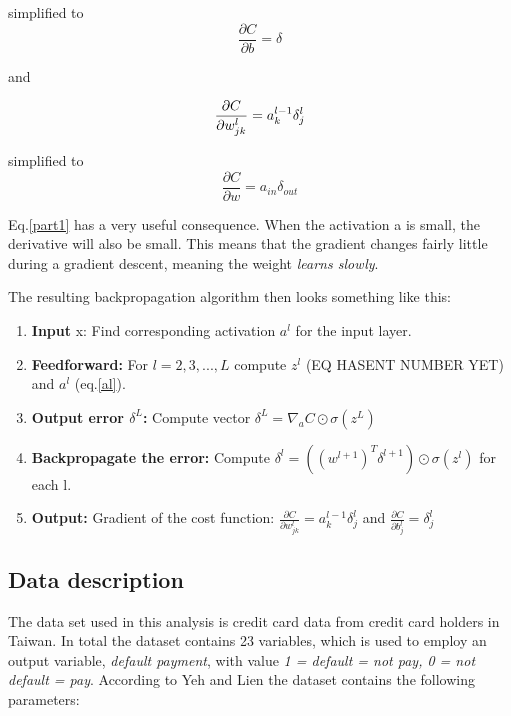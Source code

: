 \documentclass[a4paper,11pt,twocolumn]{article}
\begin{document}
simplified to 
\begin{equation}
\frac{\partial C}{\partial b} = \delta
\end{equation}

and

\begin{equation}
\frac{\partial C}{\partial w_{jk}^l} = a_k^{l-1}\delta_j^l \\
\label{part1}
\end{equation}

simplified to 
\begin{equation}
\frac{\partial C}{\partial w} = a_{in}\delta_{out}
\end{equation}

Eq.\eqref{part1} has a very useful consequence. When the activation a is small, the derivative will also be small. This means that the gradient changes fairly little during a gradient descent, meaning the weight \textit{learns slowly}. 

The resulting backpropagation algorithm then looks something like this:
\begin{enumerate}
\item \textbf{Input} x: Find corresponding activation $a^l$ for the input layer.
\item \textbf{Feedforward:} For $l = 2,3,...,L$ compute $z^l$ (EQ HASENT NUMBER YET) and $a^l$ (eq.\eqref{al}).
\item \textbf{Output error $\delta^L$:} Compute vector $\delta^L = \nabla_aC \odot\sigma(z^L)$ 
\item \textbf{Backpropagate the error:} Compute $\delta^l = ((w^{l+1})^T\delta^{l+1})\odot \sigma(z^l)$ for each l.
\item \textbf{Output:} Gradient of the cost function: $\frac{\partial C}{\partial w_{jk}^l} = a_k^{l-1}\delta_j^l$ and    $\frac{\partial C}{\partial b_j^l} = \delta_j^l$
\end{enumerate}

\cite{Nielsen}

\subsection{Data description}

The data set used in this analysis is credit card data from credit card holders in Taiwan. In total the dataset contains 23 variables, which is used to employ an output variable, \textit{default payment}, with value \textit{1 = default = not pay, 0 = not default = pay}. According to Yeh and Lien \cite{data} the dataset contains the following parameters:
   
\end{document}
